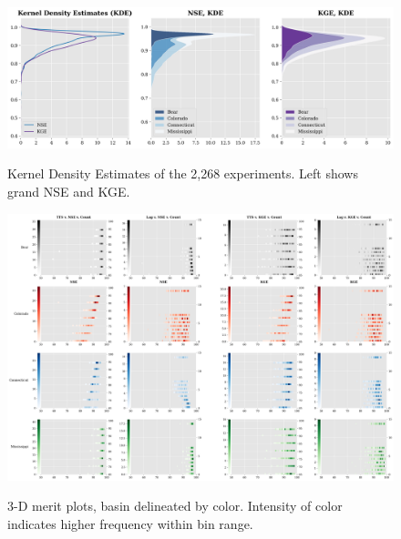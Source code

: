 \begin{figure}[!ht]
	\centering
    \caption{Kernel Density Estimates of the 2,268 experiments. Left shows grand NSE and KGE.}
	\includegraphics[width=1.0\linewidth]{m1/ims/fig1_5.png}
    \label{fig1_5}
\end{figure}

\begin{figure}[!ht]
	\centering
    \caption{3-D merit plots, basin delineated by color. Intensity of color indicates higher frequency within bin range.}
	\includegraphics[width=1.0\linewidth]{m1/ims/fig1_6.png}
    \label{fig1_6}
\end{figure}




